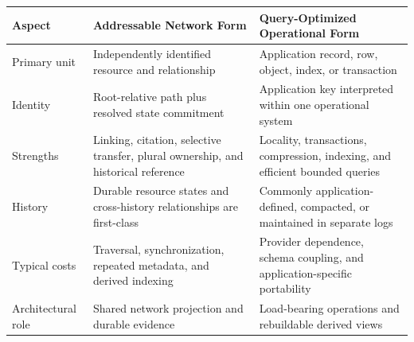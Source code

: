 \begin{tabularx}{\textwidth}{@{}p{}XX@{}}
\toprule
\textbf{Aspect} & \textbf{Addressable Network Form} & \textbf{Query-Optimized Operational Form} \\
\midrule
Primary unit & Independently identified resource and relationship & Application record, row, object, index, or transaction \\
Identity & Root-relative path plus resolved state commitment & Application key interpreted within one operational system \\
Strengths & Linking, citation, selective transfer, plural ownership, and historical reference & Locality, transactions, compression, indexing, and efficient bounded queries \\
History & Durable resource states and cross-history relationships are first-class & Commonly application-defined, compacted, or maintained in separate logs \\
Typical costs & Traversal, synchronization, repeated metadata, and derived indexing & Provider dependence, schema coupling, and application-specific portability \\
Architectural role & Shared network projection and durable evidence & Load-bearing operations and rebuildable derived views \\
\bottomrule
\end{tabularx}
